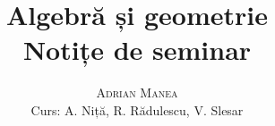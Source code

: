 \documentclass[12pt, a4paper]{book}
\begin{document}
\thispagestyle{empty}
\pagestyle{plain} %

\title{\huge\textbf{Algebră și geometrie} \\ \Large{Notițe de seminar}}
\vspace{1cm}
\author{\Large\textsc{Adrian Manea} \\ \large{Curs: A. Niță, R. Rădulescu, V. Slesar }}

\maketitle

\tableofcontents

\setcounter{page}{1} %











\renewcommand{\indexname}{Index}
\printindex



\nocite{*}
\end{document}
